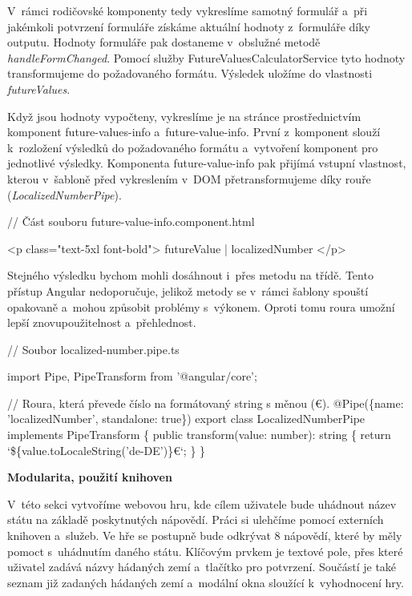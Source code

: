V~rámci rodičovské komponenty tedy vykreslíme samotný formulář a~při jakémkoli potvrzení formuláře získáme aktuální hodnoty z~formuláře díky outputu. 
Hodnoty formuláře pak dostaneme v~obslužné metodě \emph{handleFormChanged}. Pomocí služby FutureValuesCalculatorService tyto hodnoty transformujeme do požadovaného formátu. 
Výsledek uložíme do vlastnosti \emph{futureValues}.

Když jsou hodnoty vypočteny, vykreslíme je na stránce prostřednictvím komponent future-values-info a~future-value-info. 
První z~komponent slouží k~rozložení výsledků do požadovaného formátu a~vytvoření komponent pro jednotlivé výsledky. 
Komponenta future-value-info pak přijímá vstupní vlastnost, kterou v~šabloně před vykreslením v~DOM přetransformujeme díky rouře (\emph{LocalizedNumberPipe}).

\begin{prog}
// Část souboru future-value-info.component.html

<p class="text-5xl font-bold">{{ futureValue | localizedNumber }}</p>
\end{prog}

Stejného výsledku bychom mohli dosáhnout i~přes metodu na třídě. Tento přístup Angular nedoporučuje, jelikož metody se v~rámci šablony spouští opakovaně a~mohou způsobit problémy s~výkonem. 
Oproti tomu roura umožní lepší znovupoužitelnost a~přehlednost.

\begin{prog}
// Soubor localized-number.pipe.ts

import {Pipe, PipeTransform} from '@angular/core';

// Roura, která převede číslo na formátovaný string s měnou (€).
@Pipe(\{name: 'localizedNumber', standalone: true\})
export class LocalizedNumberPipe implements PipeTransform \{
  public transform(value: number): string \{
    return `\$\{value.toLocaleString('de-DE')\}€`;
  \}
\}
\end{prog}

\begin{flushleft}
  \textbf{Modularita, použití knihoven}
\end{flushleft}

V~této sekci vytvoříme webovou hru, kde cílem uživatele bude uhádnout název státu na základě poskytnutých nápovědí. Práci si ulehčíme pomocí externích knihoven a~služeb.
Ve hře se postupně bude odkrývat 8 nápovědí, které by měly pomoct s~uhádnutím daného státu. 
Klíčovým prvkem je textové pole, přes které uživatel zadává názvy hádaných zemí a~tlačítko pro potvrzení. 
Součástí je také seznam již zadaných hádaných zemí a~modální okna sloužící k~vyhodnocení hry.

